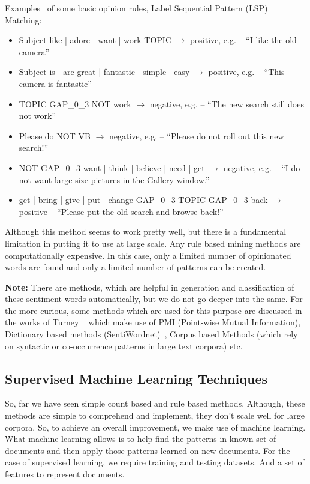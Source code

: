 Examples~\parencite{ch2:icdmtutorial} of some basic opinion rules, Label Sequential Pattern (LSP) Matching:
\begin{itemize}
\item Subject {like | adore | want | work} TOPIC $\rightarrow$ positive, e.g. – ``I like the old camera”
\item Subject {is | are} {great | fantastic | simple | easy} $\rightarrow$ positive, e.g. – ``This camera is fantastic”
\item TOPIC GAP\_0\_3 NOT work $\rightarrow$ negative, e.g. – ``The new search still does not work”
\item Please do NOT VB $\rightarrow$ negative, e.g. – ``Please do not roll out this new search!”
\item NOT GAP\_0\_3 {want | think | believe | need | get} $\rightarrow$ negative, e.g. – ``I do not want large size pictures in the Gallery window.”
\item {get | bring | give | put | change} GAP\_0\_3 TOPIC GAP\_0\_3 back $\rightarrow$ positive
– ``Please put the old search and browse back!”
\end{itemize} 

Although this method seems to work pretty well, but there is a fundamental limitation in putting it to use at large scale. Any rule based mining methods are computationally expensive. In this case, only a limited number of opinionated words are found and only a limited number of patterns can be created. 

\textbf{Note: }There are methods, which are helpful in generation and classification of these sentiment words automatically, but we do not go deeper into the same. For the more curious, some methods which are used for this purpose are discussed in the works of Turney ~\parencite{ch1:turney} which make use of PMI (Point-wise Mutual Information), Dictionary based methods (SentiWordnet)~\parencite{sentiwn}, Corpus based Methods (which rely on syntactic or co-occurrence patterns in large text corpora) etc. 

\subsection{Supervised Machine Learning Techniques}
So, far we have seen simple count based and rule based methods. Although, these methods are simple to comprehend and implement,  they don't scale well for large corpora. So, to achieve an overall improvement, we make use of machine learning. What machine learning allows is to help find the patterns in known set of documents and then apply those patterns learned on new documents. For the case of supervised learning, we require training and testing datasets. And a set of features to represent documents. 
\newline

